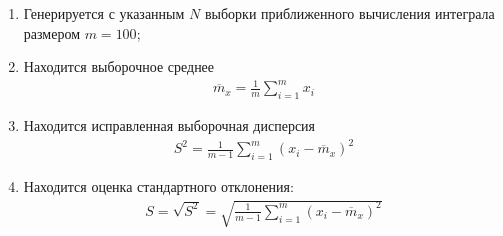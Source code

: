 \begin{enumerate}
	\item Генерируется с указанным \(N\) выборки приближенного вычисления интеграла размером \(m=100\);
	\item Находится выборочное среднее
	      \begin{align}
		      \overline{m}_x = \frac{1}{m}\sum_{i=1}^m x_i
	      \end{align}
	\item Находится исправленная выборочная дисперсия
	      \begin{align}
		      S^2 = \frac{1}{m-1}\sum_{i=1}^m (x_i - \overline{m}_x)^2
	      \end{align}
	\item Находится оценка стандартного отклонения:
	      \begin{align}
		      S = \sqrt{S^2} = \sqrt{\frac{1}{m-1}\sum_{i=1}^m(x_i-\overline{m}_x)^2}
	      \end{align}
\end{enumerate}

